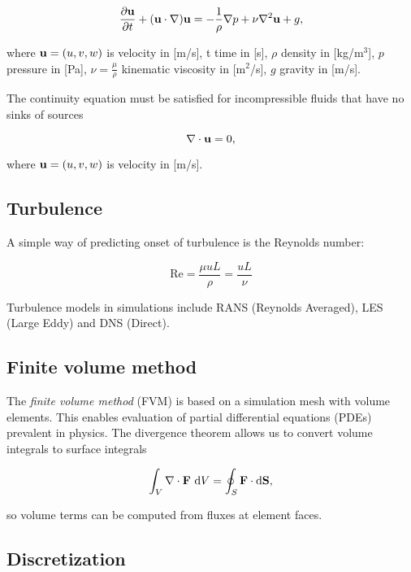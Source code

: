 \documentclass[12pt]{article}
\newcommand{\D}{\text{d}}
\newcommand{\vb}[1]{\text{\textbf{#1}}}
\begin{document}
\begin{equation}
  \frac{\partial \vb u}{\partial t} + (\vb u \cdot \nabla) \vb u = -\frac{1}{\rho} \nabla p + \nu \nabla^2 \vb u + g,
\end{equation}

where $\vb u = (u, v, w)$ is velocity in [m/s], t time in [s], $\rho$ density in [kg/m$^3$], $p$ pressure in [Pa], $\nu=\frac{\mu}{\rho}$ kinematic viscosity in [m$^2$/s], $g$ gravity in [m/s].

The continuity equation must be satisfied for incompressible fluids that have no sinks of sources

\begin{equation}
  \nabla \cdot \vb u = 0,
\end{equation}

where $\vb u = (u, v, w)$ is velocity in [m/s].

\subsection{Turbulence}

\noindent

A simple way of predicting onset of turbulence is the Reynolds number:

$$
\text{Re} = \frac{\mu u L}{\rho} = \frac{u L}{\nu}
$$

Turbulence models in simulations include RANS (Reynolds Averaged), LES (Large Eddy) and DNS (Direct).

\subsection{Finite volume method}

The \textit{finite volume method} (FVM) is based on a simulation mesh with volume elements. This enables evaluation of partial differential equations (PDEs) prevalent in physics. The divergence theorem allows us to convert volume integrals to surface integrals

$$
\int_V \nabla \cdot \vb F \ \D V = \oint_S \vb F \cdot \D \vb S,
$$

\noindent
so volume terms can be computed from fluxes at element faces.



\subsection{Discretization}

\noindent
\end{document}
